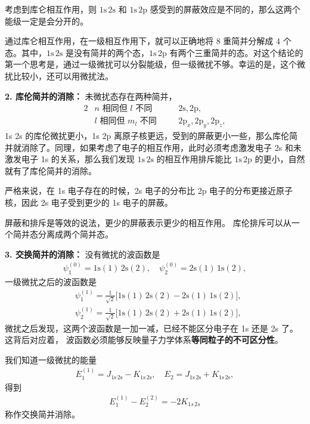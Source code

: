 考虑到库仑相互作用，则 $\mathrm{1s\,2s}$ 和 $\mathrm{1s\,2p}$ 感受到的屏蔽效应是不同的，那么这两个能级一定是会分开的。

通过库仑相互作用，在一级相互作用下，就可以正确地将 8 重简并分解成 4 个态。其中，$\mathrm{1s\,2s}$ 是没有简并的两个态，$\mathrm{1s\,2p}$ 有两个三重简并的态。对这个结论的第一个思考是，通过一级微扰可以分裂能级，但一级微扰不够。幸运的是，这个微扰比较小，还可以用微扰法。

\textbf{2. 库伦简并的消除：}
未微扰态存在两种简并，
\begin{alignat}{2}
    &\text{$n$ 相同但 $l$ 不同}\quad &&\mathrm{2s, 2p},\\
    &\text{$l$ 相同但 $m_l$ 不同}\quad &&\mathrm{2p}_x, \mathrm{2p}_y, \mathrm{2p}_z,
\end{alignat}
1s 2s 的库伦微扰更小，1s 2p 离原子核更远，受到的屏蔽更小一些，那么库伦简并就消除了。同理，如果考虑了电子的相互作用，此时必须考虑激发电子 2s 和未激发电子 1s 的关系，那么我们发现 $\mathrm{1s\,2s}$ 的相互作用排斥能比 $\mathrm{1s\,2p}$ 的更小，自然就有了库伦简并的消除。

严格来说，在 1s 电子存在的时候，2s 电子的分布比 2p 电子的分布更接近原子核，因此 2s 电子受到更少的 1s 电子的屏蔽。

屏蔽和排斥是等效的说法，更少的屏蔽表示更少的相互作用。
库伦排斥可以从一个简并态分离成两个简并态。

\textbf{3. 交换简并的消除：}
没有微扰的波函数是
\begin{align}
    \psi_1^{(0)} = \mathrm{1s(1)\,2s(2)}, \quad 
    \psi_2^{(0)} = \mathrm{2s(1)\,1s(2)},
\end{align}
一级微扰之后的波函数是
\begin{align}
    &\psi_1^{(1)} = \frac1{\sqrt2} \big[\mathrm{1s(1)\,2s(2) - 2s(1)\,1s(2)}\big], \\
    &\psi_2^{(1)} = \frac1{\sqrt2} \big[\mathrm{1s(1)\,2s(2) + 2s(1)\,1s(2)}\big],
\end{align}
微扰之后发现，这两个波函数是一加一减，已经不能区分电子在 1s 还是 2s 了。这背后对应着，
波函数必须能够反映量子力学体系\textbf{等同粒子的不可区分性}。

我们知道一级微扰的能量
\begin{align}
    E_1^{(1)} = J_{\mathrm{1s\,2s}} - K_{\mathrm{1s\,2s}},\quad E_2 = J_{\mathrm{1s\,2s}} + K_{\mathrm{1s\,2s}},
\end{align}
得到
\begin{align}
    E_1^{(1)} - E_2^{(2)} = - 2K_{1s\,2s}
\end{align}
称作交换简并消除。

